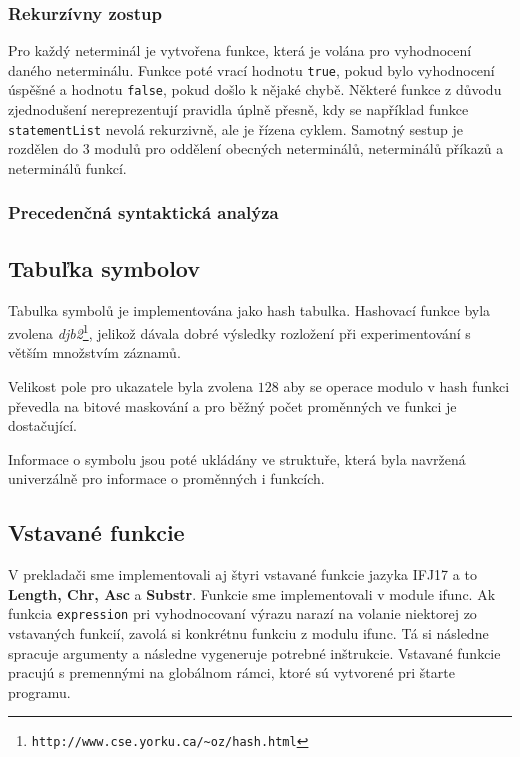 \documentclass{article}
\begin{document}
            \subsubsection{Rekurzívny zostup}
                Pro každý neterminál je vytvořena funkce, která je volána pro vyhodnocení daného neterminálu.
                Funkce poté vrací hodnotu \texttt{true}, pokud bylo vyhodnocení úspěšné a hodnotu \texttt{false}, pokud došlo k nějaké chybě. Některé funkce z důvodu zjednodušení nereprezentují pravidla úplně přesně, kdy se například funkce \texttt{statementList} nevolá rekurzivně, ale je řízena cyklem. Samotný sestup je rozdělen do 3 modulů pro oddělení obecných neterminálů, neterminálů příkazů a neterminálů funkcí.
            
            \subsubsection{Precedenčná syntaktická analýza}
    
        \subsection{Tabuľka symbolov}
            Tabulka symbolů je implementována jako hash tabulka. Hashovací funkce byla zvolena \emph{djb2}\footnote{\texttt{http://www.cse.yorku.ca/\~{}oz/hash.html}}, jelikož dávala dobré výsledky rozložení při experimentování s větším množstvím záznamů.
            
            Velikost pole pro ukazatele byla zvolena $128$ aby se operace modulo v hash funkci převedla na bitové maskování a pro běžný počet proměnných ve funkci je dostačující.
            
            Informace o symbolu jsou poté ukládány ve struktuře, která byla navržená univerzálně pro informace o proměnných i funkcích.
        
        \subsection{Vstavané funkcie}
            V prekladači sme implementovali aj štyri vstavané funkcie jazyka IFJ17 a to \textbf{Length, Chr, Asc} a \textbf{Substr}.
            Funkcie sme implementovali v module ifunc. Ak funkcia \texttt{expression} pri vyhodnocovaní výrazu narazí na volanie 
            niektorej zo vstavaných funkcií, zavolá si konkrétnu funkciu z modulu ifunc. Tá si následne spracuje argumenty a následne
            vygeneruje potrebné inštrukcie. Vstavané funkcie pracujú s premennými na globálnom rámci, ktoré sú vytvorené pri štarte programu.
\end{document}
